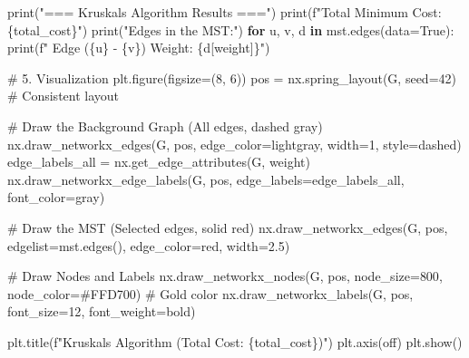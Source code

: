\documentclass[
  letterpaper,
  DIV=11,
  numbers=noendperiod]{scrreprt}
\newenvironment{Shaded}{\begin{snugshade}}{\end{snugshade}}
\newcommand{\BuiltInTok}[1]{\textcolor[rgb]{0.00,0.23,0.31}{#1}}
\newcommand{\CommentTok}[1]{\textcolor[rgb]{0.37,0.37,0.37}{#1}}
\newcommand{\ControlFlowTok}[1]{\textcolor[rgb]{0.00,0.23,0.31}{\textbf{#1}}}
\newcommand{\DecValTok}[1]{\textcolor[rgb]{0.68,0.00,0.00}{#1}}
\newcommand{\FloatTok}[1]{\textcolor[rgb]{0.68,0.00,0.00}{#1}}
\newcommand{\KeywordTok}[1]{\textcolor[rgb]{0.00,0.23,0.31}{\textbf{#1}}}
\newcommand{\NormalTok}[1]{\textcolor[rgb]{0.00,0.23,0.31}{#1}}
\newcommand{\OperatorTok}[1]{\textcolor[rgb]{0.37,0.37,0.37}{#1}}
\newcommand{\SpecialCharTok}[1]{\textcolor[rgb]{0.37,0.37,0.37}{#1}}
\newcommand{\SpecialStringTok}[1]{\textcolor[rgb]{0.13,0.47,0.30}{#1}}
\newcommand{\StringTok}[1]{\textcolor[rgb]{0.13,0.47,0.30}{#1}}
\newcommand{\VariableTok}[1]{\textcolor[rgb]{0.07,0.07,0.07}{#1}}
\begin{document}
\begin{Shaded}
\begin{Highlighting}[]
\BuiltInTok{print}\NormalTok{(}\StringTok{"=== Kruskal\textquotesingle{}s Algorithm Results ==="}\NormalTok{)}
\BuiltInTok{print}\NormalTok{(}\SpecialStringTok{f"Total Minimum Cost: }\SpecialCharTok{\{}\NormalTok{total\_cost}\SpecialCharTok{\}}\SpecialStringTok{"}\NormalTok{)}
\BuiltInTok{print}\NormalTok{(}\StringTok{"Edges in the MST:"}\NormalTok{)}
\ControlFlowTok{for}\NormalTok{ u, v, d }\KeywordTok{in}\NormalTok{ mst.edges(data}\OperatorTok{=}\VariableTok{True}\NormalTok{):}
    \BuiltInTok{print}\NormalTok{(}\SpecialStringTok{f"  Edge (}\SpecialCharTok{\{}\NormalTok{u}\SpecialCharTok{\}}\SpecialStringTok{ {-} }\SpecialCharTok{\{}\NormalTok{v}\SpecialCharTok{\}}\SpecialStringTok{) Weight: }\SpecialCharTok{\{}\NormalTok{d[}\StringTok{\textquotesingle{}weight\textquotesingle{}}\NormalTok{]}\SpecialCharTok{\}}\SpecialStringTok{"}\NormalTok{)}

\CommentTok{\# 5. Visualization}
\NormalTok{plt.figure(figsize}\OperatorTok{=}\NormalTok{(}\DecValTok{8}\NormalTok{, }\DecValTok{6}\NormalTok{))}
\NormalTok{pos }\OperatorTok{=}\NormalTok{ nx.spring\_layout(G, seed}\OperatorTok{=}\DecValTok{42}\NormalTok{)  }\CommentTok{\# Consistent layout}

\CommentTok{\# Draw the Background Graph (All edges, dashed gray)}
\NormalTok{nx.draw\_networkx\_edges(G, pos, edge\_color}\OperatorTok{=}\StringTok{\textquotesingle{}lightgray\textquotesingle{}}\NormalTok{, width}\OperatorTok{=}\DecValTok{1}\NormalTok{, style}\OperatorTok{=}\StringTok{\textquotesingle{}dashed\textquotesingle{}}\NormalTok{)}
\NormalTok{edge\_labels\_all }\OperatorTok{=}\NormalTok{ nx.get\_edge\_attributes(G, }\StringTok{\textquotesingle{}weight\textquotesingle{}}\NormalTok{)}
\NormalTok{nx.draw\_networkx\_edge\_labels(G, pos, edge\_labels}\OperatorTok{=}\NormalTok{edge\_labels\_all, font\_color}\OperatorTok{=}\StringTok{\textquotesingle{}gray\textquotesingle{}}\NormalTok{)}

\CommentTok{\# Draw the MST (Selected edges, solid red)}
\NormalTok{nx.draw\_networkx\_edges(G, pos, edgelist}\OperatorTok{=}\NormalTok{mst.edges(), edge\_color}\OperatorTok{=}\StringTok{\textquotesingle{}red\textquotesingle{}}\NormalTok{, width}\OperatorTok{=}\FloatTok{2.5}\NormalTok{)}

\CommentTok{\# Draw Nodes and Labels}
\NormalTok{nx.draw\_networkx\_nodes(G, pos, node\_size}\OperatorTok{=}\DecValTok{800}\NormalTok{, node\_color}\OperatorTok{=}\StringTok{\textquotesingle{}\#FFD700\textquotesingle{}}\NormalTok{) }\CommentTok{\# Gold color}
\NormalTok{nx.draw\_networkx\_labels(G, pos, font\_size}\OperatorTok{=}\DecValTok{12}\NormalTok{, font\_weight}\OperatorTok{=}\StringTok{\textquotesingle{}bold\textquotesingle{}}\NormalTok{)}

\NormalTok{plt.title(}\SpecialStringTok{f"Kruskal\textquotesingle{}s Algorithm (Total Cost: }\SpecialCharTok{\{}\NormalTok{total\_cost}\SpecialCharTok{\}}\SpecialStringTok{)"}\NormalTok{)}
\NormalTok{plt.axis(}\StringTok{\textquotesingle{}off\textquotesingle{}}\NormalTok{)}
\NormalTok{plt.show()}
\end{Highlighting}
\end{Shaded}
\end{document}
